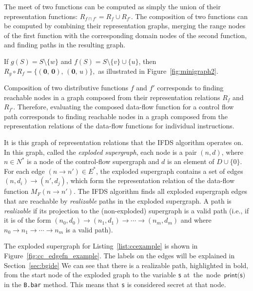 The meet of two functions can be computed as simply the union of their representation
functions: $R_{f\sqcap f'} = R_f \cup R_{f'}$. The composition of two functions can be
computed by combining their representation graphs, merging the range nodes of the
first function with the corresponding domain nodes of the second function, and finding
paths in the resulting graph.
  

\begin{example}
    If $g(S)=S\setminus\{w\}$ and $f(S) = S\setminus\{v\} \cup \{u\}$, then
    $
    R_g\circ R_f=\{(\mathbf0,\,\mathbf0),\,(\mathbf0,\,u)\},
    $
  as illustrated in Figure~\ref{fig:minigraph2}.
\end{example}

Composition of two distributive
functions $f$ and $f'$ corresponds to finding reachable nodes in a graph composed from their representation
relations $R_f$ and $R_{f'}$. Therefore, evaluating the composed data-flow function for a control
flow path corresponds to finding reachable nodes in a graph composed from the representation relations
of the data-flow functions for individual instructions.

It is this graph of representation relations that the IFDS algorithm operates on.
In this graph, called the \textit{exploded supergraph}, each node is a pair $(n,d)$, where
$n\in N^*$ is a node of the control-flow supergraph and $d$ is an element of $D\cup\{0\}$.
For each edge $(n \to n') \in E^*$, the exploded supergraph contains a set of edges
$(n,d_i) \to (n',d_j)$, which form the representation relation of the data-flow function
$M_F(n \to n')$. The IFDS algorithm finds all exploded supergraph edges that are reachable by
\textit{realizable} paths in the exploded supergraph. A path
is \textit{realizable} if its projection to the (non-exploded) supergraph is a valid
path (i.e., if it is of the form $(n_0, d_0) \to (n_1,d_1) \to \cdots \to (n_m,d_m)$
and where $n_0 \to n_1 \to \cdots \to n_m$ is a valid path).

 

\begin{example}
  The exploded supergraph for Listing~\ref{list:ccexample} is shown in Figure~\ref{fig:cc_edgefn_example}.
  The labels on the edges will be explained in Section~\ref{sec:bgide}
  We can see that there is a realizable path, highlighted in bold,
  from the start node of the exploded graph to the variable \verb's' at~the~node~$\textsf{print(s)}$ in the \verb'B.bar' method. This means that \verb's' is considered secret at that node.
\end{example}

